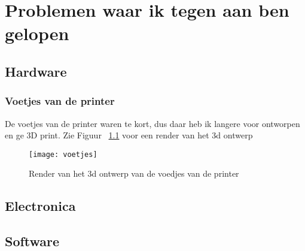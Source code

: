 \chapter{Problemen waar ik tegen aan ben gelopen}
\label{Problemen_waar_ik_tegen_aan_ben_gelopen}

\section{Hardware}

\subsection{Voetjes van de printer}

De voetjes van de printer waren te kort, dus daar heb ik langere voor ontworpen
en ge 3D print. Zie Figuur ~\ref{fig:voetjes} voor een render van het 3d
ontwerp

\begin{figure}[h]
\centerline{\texttt{[image: voetjes]}}
\caption{Render van het 3d ontwerp van de voedjes van de printer}
\label{fig:voetjes}
\end{figure}

\section{Electronica}
\section{Software}
